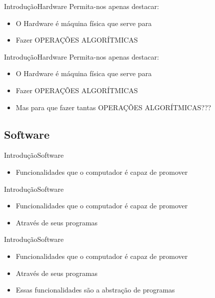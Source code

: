 \documentclass{beamer}
\begin{document}
\begin{frame}{Introdução}{Hardware}
  Permita-nos apenas destacar:
  \begin{itemize}
    \item O Hardware é máquina física que serve para 
    \item Fazer OPERAÇÕES ALGORÍTMICAS
  \end{itemize}
\end{frame}

\begin{frame}{Introdução}{Hardware}
  Permita-nos apenas destacar:
  \begin{itemize}
    \item O Hardware é máquina física que serve para 
    \item Fazer OPERAÇÕES ALGORÍTMICAS
    \item Mas para que fazer tantas OPERAÇÕES ALGORÍTMICAS???
  \end{itemize}
\end{frame}


\subsection{Software}

\begin{frame}{Introdução}{Software}
  \begin{itemize}
    \item Funcionalidades que o computador é capaz de promover
    \end{itemize}
\end{frame}

\begin{frame}{Introdução}{Software}
  \begin{itemize}
    \item Funcionalidades que o computador é capaz de promover
    \item Através de seus programas
    \end{itemize}
\end{frame}

\begin{frame}{Introdução}{Software}
  \begin{itemize}
    \item Funcionalidades que o computador é capaz de promover
    \item Através de seus programas
    \item Essas funcionalidades são a abstração de programas
    \end{itemize}
\end{frame}
\end{document}
